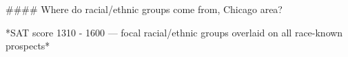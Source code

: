 #### Where do racial/ethnic groups come from, Chicago area?

*SAT score 1310 - 1600 — focal racial/ethnic groups overlaid on all race-known prospects*

